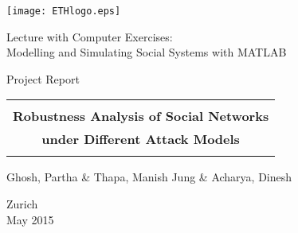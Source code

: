 \thispagestyle{empty}


\begin{center}
\texttt{[image: ETHlogo.eps]}

\bigskip


\bigskip


\bigskip


\LARGE{ 	Lecture with Computer Exercises:\\ }
\LARGE{ Modelling and Simulating Social Systems with MATLAB\\}

\bigskip

\bigskip

\small{Project Report}\\

\bigskip

\bigskip

\bigskip

\bigskip


\begin{tabular}{|c|}
\hline
\\
\textbf{\LARGE{Robustness Analysis of Social Networks}}\\
\textbf{\LARGE{under Different Attack Models}}\\
\\
\hline
\end{tabular}
\bigskip

\bigskip

\bigskip

\LARGE{Ghosh, Partha \& Thapa, Manish Jung \& Acharya, Dinesh}



\bigskip

\bigskip

\bigskip

\bigskip

\bigskip

\bigskip

\bigskip

\bigskip

Zurich\\
May 2015\\

\end{center}



